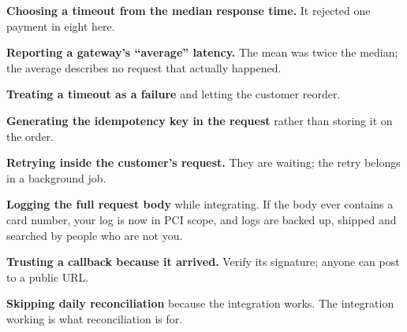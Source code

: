 \begin{pitfall}
\begin{tight}
  \item \textbf{Choosing a timeout from the median response time.} It rejected
        one payment in eight here.
  \item \textbf{Reporting a gateway's ``average'' latency.} The mean was twice
        the median; the average describes no request that actually happened.
  \item \textbf{Treating a timeout as a failure} and letting the customer
        reorder.
  \item \textbf{Generating the idempotency key in the request} rather than
        storing it on the order.
  \item \textbf{Retrying inside the customer's request.} They are waiting; the
        retry belongs in a background job.
  \item \textbf{Logging the full request body} while integrating. If the body
        ever contains a card number, your log is now in PCI scope, and logs are
        backed up, shipped and searched by people who are not you.
  \item \textbf{Trusting a callback because it arrived.} Verify its signature;
        anyone can post to a public URL.
  \item \textbf{Skipping daily reconciliation} because the integration works.
        The integration working is what reconciliation is for.
\end{tight}
\end{pitfall}

